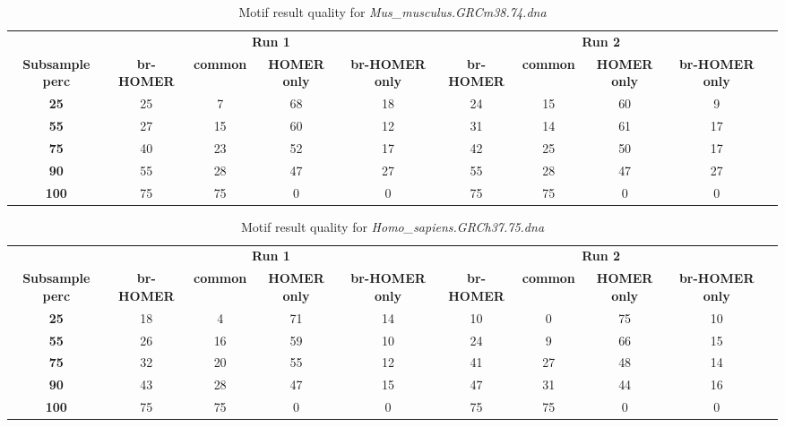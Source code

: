 \documentclass{acm_proc_article-sp}
\begin{document}
\begin{table*}[h!]
\centering
\begin{tabular}{|c|c|c|c|c|c|c|c|c|l}
\cline{1-9}
 & \multicolumn{4}{|c}{\textbf{Run 1}} & \multicolumn{4}{|c|}{\textbf{Run 2}} &  \\ \cline{1-9}
\multicolumn{1}{|p{1.7cm}|}{\centering \textbf{Subsample perc}}
& \multicolumn{1}{|p{1.30cm}|}{\centering \textbf{br- HOMER}}
& \multicolumn{1}{|p{1.30cm}|}{\centering \textbf{common}}
& \multicolumn{1}{|p{1.30cm}|}{\centering \textbf{HOMER only}}
& \multicolumn{1}{|p{1.30cm}|}{\centering \textbf{br-HOMER only}}
& \multicolumn{1}{|p{1.30cm}|}{\centering \textbf{br-HOMER}}
& \multicolumn{1}{|p{1.30cm}|}{\centering \textbf{common}}
& \multicolumn{1}{|p{1.30cm}|}{\centering \textbf{HOMER only}}
& \multicolumn{1}{|p{1.30cm}|}{\centering \textbf{br-HOMER only}}
 \\ \cline{1-9}
\textbf{25} & 25 & 7 & 68 & 18 & 24 & 15 & 60 & 9 &  \\ \cline{1-9}
\textbf{55} & 27 & 15 & 60 & 12 & 31 & 14 & 61 & 17 &  \\ \cline{1-9}
\textbf{75} & 40 & 23 & 52 & 17 & 42 & 25 & 50 & 17 &  \\ \cline{1-9}
\textbf{90} & 55 & 28 & 47 & 27 & 55 & 28 & 47 & 27 &  \\ \cline{1-9}
\textbf{100} & 75 & 75 & 0 & 0 & 75 & 75 & 0 & 0 &  \\ \cline{1-9}
\end{tabular}
\caption{Motif result quality for \textit{Mus\_musculus\-.GRCm38.74.dna}}
\end{table*}

\begin{table*}[h!]
\begin{tabular}{|c|c|c|c|c|c|c|c|c|l}
\cline{1-9}
\centering
 & \multicolumn{4}{|c}{\textbf{Run 1}} & \multicolumn{4}{|c|}{\textbf{Run 2}} &  \\ \cline{1-9}
\multicolumn{1}{|p{1.7cm}|}{\centering \textbf{Subsample perc}}
& \multicolumn{1}{|p{1.30cm}|}{\centering \textbf{br- HOMER}}
& \multicolumn{1}{|p{1.30cm}|}{\centering \textbf{common}}
& \multicolumn{1}{|p{1.30cm}|}{\centering \textbf{HOMER only}}
& \multicolumn{1}{|p{1.30cm}|}{\centering \textbf{br-HOMER only}}
& \multicolumn{1}{|p{1.30cm}|}{\centering \textbf{br-HOMER}}
& \multicolumn{1}{|p{1.30cm}|}{\centering \textbf{common}}
& \multicolumn{1}{|p{1.30cm}|}{\centering \textbf{HOMER only}}
& \multicolumn{1}{|p{1.30cm}|}{\centering \textbf{br-HOMER only}}  \\ \cline{1-9}
\textbf{25} & 18 & 4 & 71 & 14 & 10 & 0 & 75 & 10 &  \\ \cline{1-9}
\textbf{55} & 26 & 16 & 59 & 10 & 24 & 9 & 66 & 15 &  \\ \cline{1-9}
\textbf{75} & 32 & 20 & 55 & 12 & 41 & 27 & 48 & 14 &  \\ \cline{1-9}
\textbf{90} & 43 & 28 & 47 & 15 & 47 & 31 & 44 & 16 &  \\ \cline{1-9}
\textbf{100} & 75 & 75 & 0 & 0 & 75 & 75 & 0 & 0 &  \\ \cline{1-9}
\end{tabular}
\caption{Motif result quality for \textit{Homo\_sapiens\-.GRCh37.75.dna} }
\end{table*}
\end{document}
